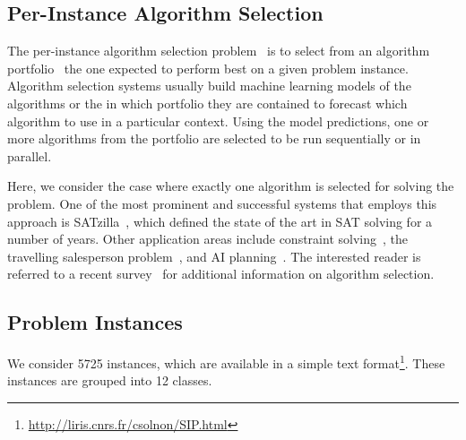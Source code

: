 \documentclass{llncs}
\begin{document}
\subsection{Per-Instance Algorithm Selection}

The per-instance algorithm selection problem~\cite{rice_algorithm_1976} is to select from an
algorithm portfolio~\cite{huberman_economics_1997,gomes_algorithm_2001} the one expected to perform
best on a given problem instance. Algorithm selection systems usually build machine learning models
of the algorithms or the in which portfolio they are contained to forecast which algorithm to use in a
particular context. Using the model predictions, one or more algorithms from the portfolio are
selected to be run sequentially or in parallel.

Here, we consider the case where exactly one algorithm is selected for solving the problem. One of
the most prominent and successful systems that employs this approach is
SATzilla~\cite{xu_satzilla_2008}, which defined the state of the art in SAT solving for a number of
years. Other application areas include constraint solving~\cite{omahony_using_2008}, the travelling
salesperson problem~\cite{kotthoff_improving_2015}, and AI planning~\cite{seipp_learning_2012}.
The interested reader is referred to a recent survey~\cite{kotthoff_algorithm_2014} for additional
information on algorithm selection.

\subsection{Problem Instances}

We consider 5725 instances, which are available in a simple text
format\footnote{\url{http://liris.cnrs.fr/csolnon/SIP.html}}. These instances are grouped into 12
classes.
\end{document}
